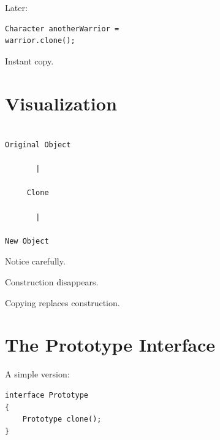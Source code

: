\documentclass[11pt,a4paper]{book}
\begin{document}

Later:

\begin{verbatim}
Character anotherWarrior =
warrior.clone();
\end{verbatim}


Instant copy.


\section{Visualization}

\begin{verbatim}

Original Object

       |

     Clone

       |

New Object

\end{verbatim}


Notice carefully.


Construction disappears.


Copying replaces construction.


\section{The Prototype Interface}

A simple version:

\begin{verbatim}
interface Prototype
{
    Prototype clone();
}
\end{verbatim}
\end{document}
